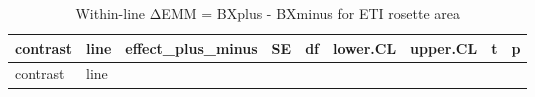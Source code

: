 \documentclass[
  10pt,
]{article}
\begin{document}
\begin{longtable}[]{@{}
  >{\raggedright\arraybackslash}p{}
  >{\raggedright\arraybackslash}p{}
  >{\raggedleft\arraybackslash}p{}
  >{\raggedleft\arraybackslash}p{}
  >{\raggedleft\arraybackslash}p{}
  >{\raggedleft\arraybackslash}p{}
  >{\raggedleft\arraybackslash}p{}
  >{\raggedleft\arraybackslash}p{}
  >{\raggedleft\arraybackslash}p{}@{}}
\caption{Within-line ΔEMM = BXplus - BXminus for ETI rosette
area}\tabularnewline
\toprule\noalign{}
\begin{minipage}[b]{\linewidth}\raggedright
contrast
\end{minipage} & \begin{minipage}[b]{\linewidth}\raggedright
line
\end{minipage} & \begin{minipage}[b]{\linewidth}\raggedleft
effect\_plus\_minus
\end{minipage} & \begin{minipage}[b]{\linewidth}\raggedleft
SE
\end{minipage} & \begin{minipage}[b]{\linewidth}\raggedleft
df
\end{minipage} & \begin{minipage}[b]{\linewidth}\raggedleft
lower.CL
\end{minipage} & \begin{minipage}[b]{\linewidth}\raggedleft
upper.CL
\end{minipage} & \begin{minipage}[b]{\linewidth}\raggedleft
t
\end{minipage} & \begin{minipage}[b]{\linewidth}\raggedleft
p
\end{minipage} \\
\midrule\noalign{}
\endfirsthead
\toprule\noalign{}
\begin{minipage}[b]{\linewidth}\raggedright
contrast
\end{minipage} & \begin{minipage}[b]{\linewidth}\raggedright
line
\end{minipage} & \begin{minipage}[b]{\linewidth}\raggedleft

\end{minipage}
\end{longtable}
\end{document}
